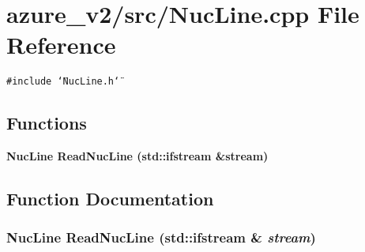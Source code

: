\section{azure\_\-v2/src/Nuc\-Line.cpp File Reference}
\label{NucLine_8cpp}
{\tt \#include \char`\"{}Nuc\-Line.h\char`\"{}}\par
\subsection*{Functions}
\begin{CompactItemize}
\item 
\bf{Nuc\-Line} \bf{Read\-Nuc\-Line} (std::ifstream \&stream)
\end{CompactItemize}


\subsection{Function Documentation}
\subsubsection{\setlength{\rightskip}{0pt plus 5cm}\bf{Nuc\-Line} Read\-Nuc\-Line (std::ifstream \& {\em stream})}\label{NucLine_8cpp_0f381544c852f5f5fe9b48e8b185b499}


